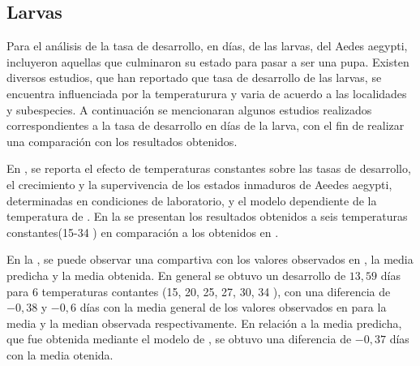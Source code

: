 \subsection{Larvas}
Para el análisis de la tasa de desarrollo, en días, de las larvas, del Aedes aegypti, incluyeron
aquellas que culminaron su estado para pasar a ser una pupa. Existen diversos
estudios, que han reportado que tasa de desarrollo de las larvas, se encuentra influenciada por la
temperaturura y varia de acuerdo a las localidades y subespecies. A continuación se mencionaran
algunos estudios realizados correspondientes a la tasa de desarrollo en días de la larva, con el
fin de realizar una comparación con los resultados obtenidos.

En \cite{rueda1990temperature}, se reporta el efecto de  temperaturas constantes sobre las tasas
de desarrollo, el crecimiento y la supervivencia de los estados inmaduros de Aeedes aegypti,
determinadas en condiciones de laboratorio, y el modelo dependiente de la temperatura de
\cite{sharpe1977reaction}. En la  se
presentan los resultados obtenidos a seis temperaturas constantes(15-34 \textcelsius) en
comparación a los obtenidos en \cite{rueda1990temperature}.

En la , se puede observar una compartiva con los
valores observados en \cite{rueda1990temperature}, la media predicha y la media obtenida. En
general se obtuvo un desarrollo de $13,59$ días para 6 temperaturas contantes (15, 20, 25, 27,
30, 34 \textcelsius), con una diferencia de $-0,38$ y $-0,6$ días con la media general de los
valores observados en \cite{rueda1990temperature} para la media y la median observada respectivamente. En relación a la media predicha, que fue obtenida mediante el modelo de
\cite{sharpe1977reaction}, se obtuvo una diferencia de $-0,37$ días con la media otenida.

